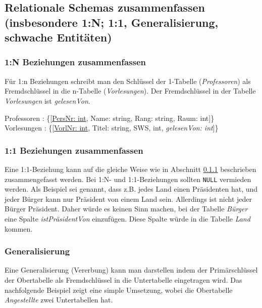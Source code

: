 \subsection{Relationale Schemas zusammenfassen (insbesondere 1:N; 1:1, Generalisierung, schwache Entitäten)}
\label{sec:schema-zusammenfassen}

\subsubsection{1:N Beziehungen zusammenfassen}
\label{sec:1-n-zusammenfassen}

Für 1:n Beziehungen schreibt man den Schlüssel der 1-Tabelle (\emph{Professoren}) als Fremdschlüssel in die n-Tabelle (\emph{Vorlesungen}). Der Fremdschlüssel in der Tabelle \emph{Vorlesungen} ist \emph{gelesenVon}.

\begin{center}
Professoren : \{[\underline{PersNr: int}, Name: string, Rang: string, Raum: int]\} \\
Vorlesungen : \{[\underline{VorlNr: int}, Titel: string, SWS, int, \emph{gelesenVon: int}]\} \\
\end{center}

\subsubsection{1:1 Beziehungen zusammenfassen}

Eine 1:1-Beziehung kann auf die gleiche Weise wie in Abschnitt \ref{sec:1-n-zusammenfassen} beschrieben zusammengefasst werden. Bei 1:N- und 1:1-Beziehungen sollten \texttt{NULL} vermieden werden. Als Beispiel sei genannt, dass z.B. jedes Land einen Präsidenten hat, und jeder Bürger kann nur Präsident von einem Land sein. Allerdings ist nicht jeder Bürger Präsident. Daher würde es keinen Sinn machen, bei der Tabelle \emph{Bürger} eine Spalte \emph{istPräsidentVon} einzufügen. Diese Spalte würde in die Tabelle \emph{Land} kommen.

\subsubsection{Generalisierung}
\label{sec:generalisierung}

Eine Generalisierung (Vererbung) kann man darstellen indem der Primärschlüssel der Obertabelle als Fremdschlüssel in die Untertabelle eingetragen wird. Das nachfolgende Beispiel zeigt eine simple Umsetzung, wobei die Obertabelle \emph{Angestellte} zwei Untertabellen hat.

